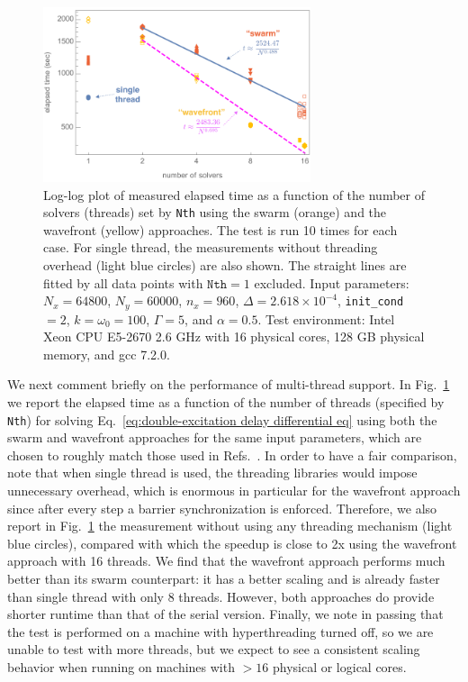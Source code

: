 \documentclass[final,1p,times]{elsarticle}
\begin{document}
\begin{figure}[htbp]
	\centering
	\includegraphics[width=0.7\textwidth]{FDTD_parallel_time_measurement3}
	\caption{Log-log plot of measured elapsed time as a function of the number of solvers (threads) set by \texttt{Nth} using the swarm (orange) and the wavefront (yellow) approaches. The test is run 10 times for each case. For single thread, the measurements without threading overhead (light blue circles) are also shown. The straight lines are fitted by all data points with $\texttt{Nth}=1$ excluded. Input parameters: $N_x=64800$, $N_y=60000$, $n_x=960$, $\Delta=2.618\times10^{-4}$, \texttt{init\_cond}$=2$, $k=\omega_0=100$, $\Gamma=5$, and $\alpha=0.5$. Test environment: Intel Xeon CPU E5-2670 \@ 2.6 GHz with 16 physical cores, 128 GB physical memory, and gcc 7.2.0.}
	\label{fig: elapsed time for multithread}
\end{figure}


We next comment briefly on the performance of multi-thread support. In Fig.~\ref{fig: elapsed time for multithread} we report the elapsed time as a function of the number of threads (specified by \texttt{Nth}) for solving Eq.~\eqref{eq:double-excitation delay differential eq} using both the swarm and wavefront approaches for the same input parameters, which are chosen to roughly match those used in Refs.~\cite{FangNJP18,FangPRA15err,FrancescoBIC}. 
In order to have a fair comparison, note that when single thread is used, the threading libraries would impose unnecessary overhead, which is enormous in particular for the wavefront approach since after every step a barrier synchronization is enforced. Therefore, we also report in Fig.~\ref{fig: elapsed time for multithread} the measurement without using any threading mechanism (light blue circles), compared with which the speedup is close to 2x using the wavefront approach with 16 threads. We find that the wavefront approach performs much better than its swarm counterpart: it has a better scaling and is already faster than single thread with only 8 threads. However, both approaches do provide shorter runtime than that of the serial version. Finally, we note in passing that the test is performed on a machine with hyperthreading turned off, so we are unable to test with more threads, but we expect to see a consistent scaling behavior when running on machines with $>16$ physical or logical cores.
\end{document}
